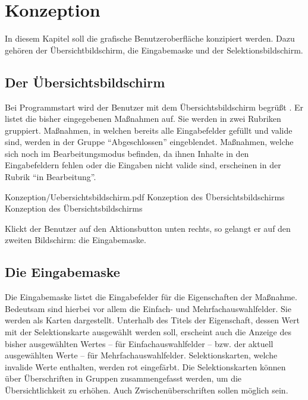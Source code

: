 \chapter{Konzeption}
\label{chap:Konzeption}

In diesem Kapitel soll die grafische Benutzeroberfläche konzipiert werden.
Dazu gehören der Übersichtbildschirm,
die Eingabemaske und der Selektionsbildschirm.

\section{Der Übersichtsbildschirm}

Bei Programmstart wird der Benutzer mit dem Übersichtsbildschirm begrüßt \Abb{\ref{fig:KonzeptionÜbersichtsbildschirm}} .
Er listet die bisher eingegebenen Maßnahmen auf. Sie werden in zwei Rubriken gruppiert.
Maßnahmen, in welchen bereits alle Eingabefelder gefüllt und valide sind, werden in der Gruppe \enquote{Abgeschlossen} eingeblendet.
Maßnahmen, welche sich noch im Bearbeitungsmodus befinden,
da ihnen Inhalte in den Eingabefeldern fehlen oder die Eingaben nicht valide sind,
erscheinen in der Rubrik \enquote{in Bearbeitung}. 



\begin{alexfigure}{Konzeption/Uebersichtsbildschirm.pdf}
  {Konzeption des Übersichtsbildschirms}
  {Konzeption des Übersichtsbildschirms}

  \label{fig:KonzeptionÜbersichtsbildschirm}

\end{alexfigure}

Klickt der Benutzer auf den Aktionsbutton unten rechts, so gelangt er auf den zweiten Bildschirm: die Eingabemaske.

\section{Die Eingabemaske}

Die Eingabemaske \Abb{\ref{fig:KonzeptionEingabemaske}} listet die Eingabefelder für die  Eigenschaften der Maßnahme.
Bedeutsam sind hierbei vor allem die Einfach- und Mehrfachauswahlfelder.
Sie werden als Karten dargestellt.
Unterhalb des Titels der Eigenschaft,
dessen Wert mit der Selektionskarte ausgewählt werden soll,
erscheint auch die Anzeige des bisher ausgewählten Wertes
-- für Einfachauswahlfelder --
bzw. der aktuell ausgewählten Werte
-- für Mehrfachauswahlfelder.
Selektionskarten, welche invalide Werte enthalten, werden rot eingefärbt.
Die Selektionskarten können über Überschriften in Gruppen zusammengefasst werden,
um die Übersichtlichkeit zu erhöhen.
Auch Zwischenüberschriften sollen möglich sein.

